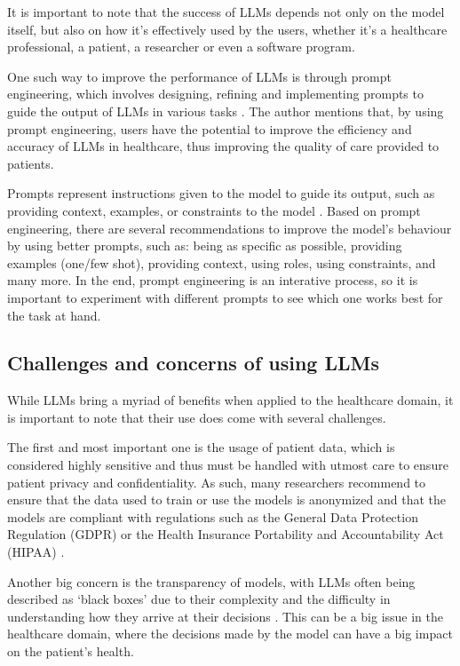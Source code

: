 It is important to note that the success of LLMs depends not only on the model itself, but also on how it's effectively used by the users, whether it's a healthcare professional, a patient, a researcher or even a software program. 

One such way to improve the performance of LLMs is through prompt engineering, which involves designing, refining and implementing prompts to guide the output of LLMs in various tasks \parencite{promptmed}. The author mentions that, by using prompt engineering, users have the potential to improve the efficiency and accuracy of LLMs in healthcare, thus improving the quality of care provided to patients.

Prompts represent instructions given to the model to guide its output, such as providing context, examples, or constraints to the model \parencite{prompt}. Based on prompt engineering, there are several recommendations to improve the model's behaviour by using better prompts, such as: being as specific as possible, providing examples (one/few shot), providing context, using roles, using constraints, and many more. In the end, prompt engineering is an interative process, so it is important to experiment with different prompts to see which one works best for the task at hand.

\subsection{Challenges and concerns of using LLMs}

While LLMs bring a myriad of benefits when applied to the healthcare domain, it is important to note that their use does come with several challenges. 

The first and most important one is the usage of patient data, which is considered highly sensitive and thus must be handled with utmost care to ensure patient privacy and confidentiality. As such, many researchers recommend to ensure that the data used to train or use the models is anonymized and that the models are compliant with regulations such as the General Data Protection Regulation (GDPR) or the Health Insurance Portability and Accountability Act (HIPAA) \parencite{llm_healthcare,llm_healthcare2, llm_healthcare4}. 

Another big concern is the transparency of models, with LLMs often being described as `black boxes' due to their complexity and the difficulty in understanding how they arrive at their decisions \parencite{llm_healthcare,llm_healthcare2, llm_healthcare4}. This can be a big issue in the healthcare domain, where the decisions made by the model can have a big impact on the patient's health. 

